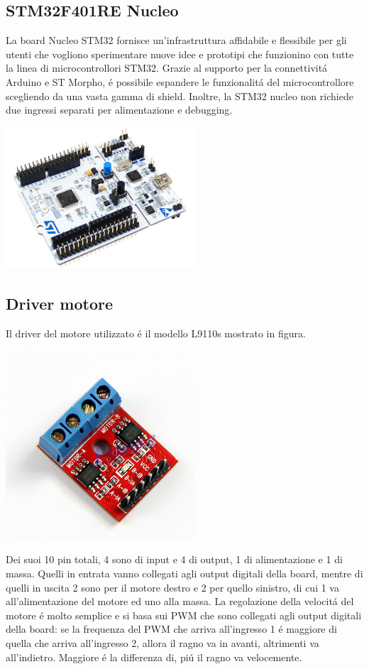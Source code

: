 \documentclass [11pt ,a4paper ,twoside ]{article}
\begin{document}
\subsection{STM32F401RE Nucleo}
La board Nucleo STM32 fornisce un'infrastruttura affidabile e flessibile per gli utenti che vogliono sperimentare nuove idee e prototipi che funzionino con tutte la linea di microcontrollori STM32. Grazie al supporto per la connettivit\'a Arduino e ST Morpho, \'e possibile espandere le funzionalit\'a del microcontrollore scegliendo da una vasta gamma di shield. Inoltre, la STM32 nucleo non richiede due ingressi separati per alimentazione e debugging.
\begin{center}
\includegraphics[keepaspectratio, width=200pt]{Images/STM32.png}
\end{center}
\subsection{Driver motore}
Il driver del motore utilizzato \'e il modello L9110s mostrato in figura. 
\begin{center}
\includegraphics[keepaspectratio, width=200pt]{Images/motor_driver.png}
\end{center}
Dei suoi 10 pin totali, 4 sono di input e 4 di output, 1 di alimentazione e 1 di massa. Quelli in entrata vanno collegati agli output digitali della board, mentre di quelli in uscita 2 sono per il motore destro e 2 per quello sinistro, di cui 1 va all'alimentazione del motore ed uno alla massa. La regolazione della velocit\'a del motore \'e molto semplice e si basa sui PWM che sono collegati agli output digitali della board: se la frequenza del PWM  che arriva all'ingresso 1 \'e maggiore di quella che arriva all'ingresso 2, allora il ragno va in avanti, altrimenti va all'indietro. Maggiore \'e la differenza di, pi\'u il ragno va velocemente.
\end{document}
